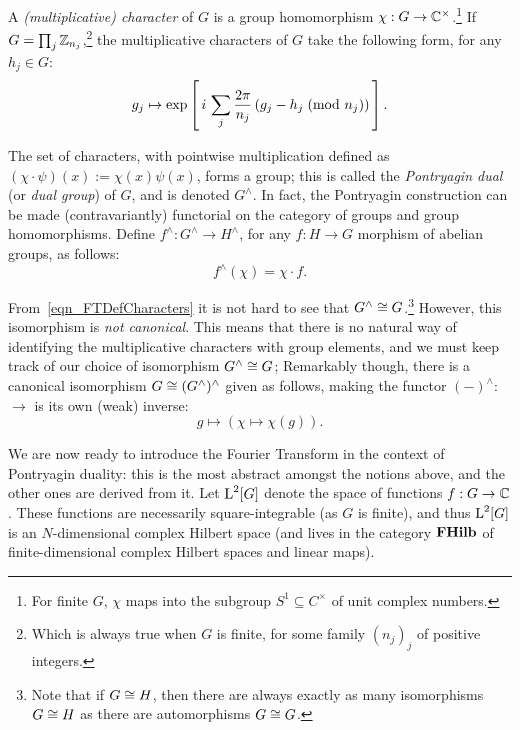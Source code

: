 A \emph{(multiplicative) character} of $G$ is a group homomorphism $\chi:G\to \mathbb{C}^\times$.\footnote{For finite $G$, $\chi$ maps into the subgroup $S^1 \subseteq C^\times$ of unit complex numbers.} If $G = \prod_j \mathbb{Z}_{n_j}$,\footnote{Which is always true when $G$ is finite, for some family $(n_j)_j$ of positive integers.} the multiplicative characters of $G$ take the following form, for any $h_j \in G$:
\begin{equation}
\label{eqn_FTDefCharacters}
  g_j \mapsto \exp\left[\, i \, \sum_j \frac{2 \pi}{n_j} \left(g_j-h_j \; (\text{mod } n_j)\right) \, \right].
\end{equation}

The set of characters, with pointwise multiplication defined as $(\chi\cdot\psi)(x):=\chi(x)\psi(x)$, forms a group; this is called the \emph{Pontryagin dual} (or \emph{dual group}) of $G$, and is denoted $G^\wedge$. In fact, the Pontryagin construction can be made (contravariantly) functorial on the category  of groups and group homomorphisms. Define $f^\wedge : G^\wedge \rightarrow H^\wedge$, for any $f: H \rightarrow G$ morphism of abelian groups, as follows:
\begin{equation*}
  f^\wedge( \chi ) = \chi \cdot f.
\end{equation*}

From~\eqref{eqn_FTDefCharacters} it is not hard to see that $G^\wedge \cong G$.\footnote{Note that if $G \cong H$, then there are always exactly as many isomorphisms $G \cong H$ as there are automorphisms $G \cong G$.} However, this isomorphism is \emph{not canonical}. This means that there is no natural way of identifying the multiplicative characters with group elements, and we must keep track of our choice of isomorphism $G^\wedge \cong G$;  Remarkably though, there is a canonical isomorphism $G \cong (G^\wedge)^\wedge$ given as follows, making the functor $(-)^{\wedge}:$  $\to$  is its own (weak) inverse:
\begin{equation*}
  g \mapsto (\chi \mapsto \chi(g)).
\end{equation*}

\newcommand{\FourierTransformSym}[1]{\mathcal{F}_{#1}}
\newcommand{\InverseFourierTransformSym}[1]{\mathcal{F}_{#1}^{-1}}
\newcommand{\FourierTransform}[1]{\mathcal{F}_G[#1]}
\newcommand{\InverseFourierTransform}[1]{\mathcal{F}_G^{-1}[#1]}

We are now ready to introduce the Fourier Transform in the context of Pontryagin duality: this is the most abstract amongst the notions above, and the other ones are derived from it. Let $\operatorname{L}^2[G]$ denote the space of functions $f:G\to \mathbb{C}$. These functions are necessarily square-integrable (as $G$ is finite), and thus $\operatorname{L}^2[G]$ is an $N$-dimensional complex Hilbert space (and lives in the category $\mathbf{FHilb}$ of finite-dimensional complex Hilbert spaces and linear maps). 

